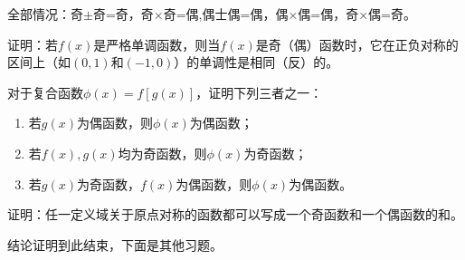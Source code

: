 \documentclass[lang=cn,math=cm,chinesefont=nofont,11pt,scheme=chinese,onecol]{elegantbook}
\begin{document}
\begin{remark}
  全部情况：奇$\pm$奇=奇，奇$\times$奇=偶,偶士偶=偶，偶×偶=偶，奇×偶=奇。
\end{remark}

\begin{exercise}
  证明：若$f(x)$是严格单调函数，则当$f(x)$是奇（偶）函数时，它在正负对称的区间上（如$(0,1)$和$(-1,0)$）的单调性是相同（反）的。
\end{exercise}

\begin{exercise}
  对于复合函数$\phi(x)=f[g(x)]$，证明下列三者之一：
\end{exercise}

\begin{enumerate}
  \item 若$g(x)$为偶函数，则$\phi(x)$为偶函数；
  \item 若$f(x),g(x)$均为奇函数，则$\phi(x)$为奇函数；
  \item 若$g(x)$为奇函数，$f(x)$为偶函数，则$\phi(x)$为偶函数。
\end{enumerate}

\begin{exercise}
  证明：任一定义域关于原点对称的函数都可以写成一个奇函数和一个偶函数的和。
\end{exercise}

\hspace*{\fill}

结论证明到此结束，下面是其他习题。
\end{document}
